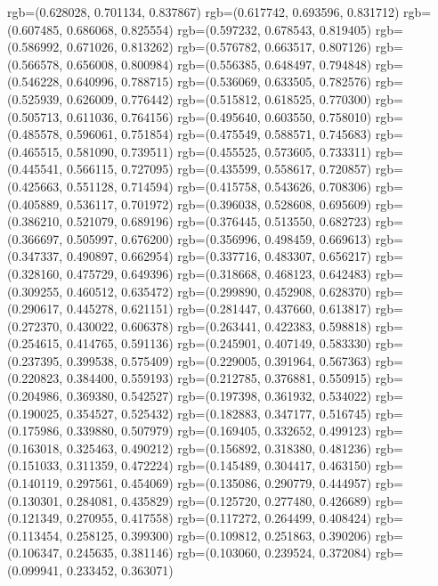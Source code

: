 {{{					rgb=(0.628028, 0.701134, 0.837867)
					rgb=(0.617742, 0.693596, 0.831712)
					rgb=(0.607485, 0.686068, 0.825554)
					rgb=(0.597232, 0.678543, 0.819405)
					rgb=(0.586992, 0.671026, 0.813262)
					rgb=(0.576782, 0.663517, 0.807126)
					rgb=(0.566578, 0.656008, 0.800984)
					rgb=(0.556385, 0.648497, 0.794848)
					rgb=(0.546228, 0.640996, 0.788715)
					rgb=(0.536069, 0.633505, 0.782576)
					rgb=(0.525939, 0.626009, 0.776442)
					rgb=(0.515812, 0.618525, 0.770300)
					rgb=(0.505713, 0.611036, 0.764156)
					rgb=(0.495640, 0.603550, 0.758010)
					rgb=(0.485578, 0.596061, 0.751854)
					rgb=(0.475549, 0.588571, 0.745683)
					rgb=(0.465515, 0.581090, 0.739511)
					rgb=(0.455525, 0.573605, 0.733311)
					rgb=(0.445541, 0.566115, 0.727095)
					rgb=(0.435599, 0.558617, 0.720857)
					rgb=(0.425663, 0.551128, 0.714594)
					rgb=(0.415758, 0.543626, 0.708306)
					rgb=(0.405889, 0.536117, 0.701972)
					rgb=(0.396038, 0.528608, 0.695609)
					rgb=(0.386210, 0.521079, 0.689196)
					rgb=(0.376445, 0.513550, 0.682723)
					rgb=(0.366697, 0.505997, 0.676200)
					rgb=(0.356996, 0.498459, 0.669613)
					rgb=(0.347337, 0.490897, 0.662954)
					rgb=(0.337716, 0.483307, 0.656217)
					rgb=(0.328160, 0.475729, 0.649396)
					rgb=(0.318668, 0.468123, 0.642483)
					rgb=(0.309255, 0.460512, 0.635472)
					rgb=(0.299890, 0.452908, 0.628370)
					rgb=(0.290617, 0.445278, 0.621151)
					rgb=(0.281447, 0.437660, 0.613817)
					rgb=(0.272370, 0.430022, 0.606378)
					rgb=(0.263441, 0.422383, 0.598818)
					rgb=(0.254615, 0.414765, 0.591136)
					rgb=(0.245901, 0.407149, 0.583330)
					rgb=(0.237395, 0.399538, 0.575409)
					rgb=(0.229005, 0.391964, 0.567363)
					rgb=(0.220823, 0.384400, 0.559193)
					rgb=(0.212785, 0.376881, 0.550915)
					rgb=(0.204986, 0.369380, 0.542527)
					rgb=(0.197398, 0.361932, 0.534022)
					rgb=(0.190025, 0.354527, 0.525432)
					rgb=(0.182883, 0.347177, 0.516745)
					rgb=(0.175986, 0.339880, 0.507979)
					rgb=(0.169405, 0.332652, 0.499123)
					rgb=(0.163018, 0.325463, 0.490212)
					rgb=(0.156892, 0.318380, 0.481236)
					rgb=(0.151033, 0.311359, 0.472224)
					rgb=(0.145489, 0.304417, 0.463150)
					rgb=(0.140119, 0.297561, 0.454069)
					rgb=(0.135086, 0.290779, 0.444957)
					rgb=(0.130301, 0.284081, 0.435829)
					rgb=(0.125720, 0.277480, 0.426689)
					rgb=(0.121349, 0.270955, 0.417558)
					rgb=(0.117272, 0.264499, 0.408424)
					rgb=(0.113454, 0.258125, 0.399300)
					rgb=(0.109812, 0.251863, 0.390206)
					rgb=(0.106347, 0.245635, 0.381146)
					rgb=(0.103060, 0.239524, 0.372084)
					rgb=(0.099941, 0.233452, 0.363071)
}}}
